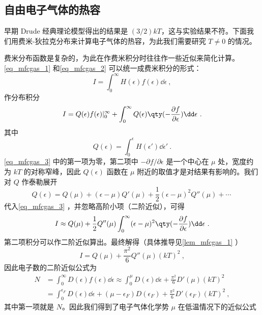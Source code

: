 \subsection{自由电子气体的热容}
早期 Drude 经典理论模型得出的结果是 $(3/2)k T$，这与实验结果不符。下面我们用费米-狄拉克分布来计算电子气体的热容，为此我们需要研究 $T\neq 0$ 的情况。

费米分布函数是复杂的，为此在作费米积分时往往作一些近似来简化计算。\autoref{eq_mfcgas_1} 和\autoref{eq_mfcgas_2} 可以统一成费米积分的形式：
\begin{equation}
I=\int_0^\infty H(\epsilon)f(\epsilon)\dd\epsilon~,
\end{equation}
作分布积分
\begin{equation}\label{eq_mfcgas_3}
I=Q(\epsilon)f(\epsilon)|_0^\infty + \int_0^\infty Q(\epsilon)\qty(-\frac{\partial f}{\partial\epsilon})\dd \epsilon~.
\end{equation}
其中
\begin{equation}
Q(\epsilon)=\int_0^\epsilon H(\epsilon')\dd\epsilon'~.
\end{equation}
\autoref{eq_mfcgas_3} 中的第一项为零，第二项中 $-\partial f/\partial \epsilon$ 是一个中心在 $\mu$ 处，宽度约为 $kT$ 的对称窄峰，因此 $Q(\epsilon)$ 函数在 $\mu$ 附近的取值才是对结果有影响的。我们对 $Q$ 作泰勒展开
\begin{equation}
Q(\epsilon)=Q(\mu)+(\epsilon-\mu)Q'(\mu)+\frac{1}{2}(\epsilon-\mu)^2 Q''(\mu)+\cdots~
\end{equation}
代入\autoref{eq_mfcgas_3} ，并忽略高阶小项（二阶近似），可得
\begin{equation}
I\approx Q(\mu)+\frac{1}{2}Q''(\mu)\int_0^\infty (\epsilon-\mu)^2 \qty(-\frac{\partial f}{\partial \epsilon})\dd\epsilon~.
\end{equation}
第二项积分可以作二阶近似算出。最终解得（具体推导见\autoref{lem_mfcgas_1} ）
\begin{equation}
I=Q(\mu)+\frac{\pi^2}{6}Q''(\mu)(k T)^2~,
\end{equation}
因此电子数的二阶近似公式为
\begin{equation}
\begin{aligned}
N&=\int_0^\infty D(\epsilon) f(\epsilon) \dd\epsilon \approx 
\int_0^\mu D(\epsilon) \dd \epsilon + \frac{\pi^2}{6}D'(\mu)(kT)^2\\
&=\int_0^{\epsilon_F} D(\epsilon)\dd\epsilon+(\mu-\epsilon_F) D(\epsilon_F) + \frac{\pi^2}{6}D'(\epsilon_F)(kT)^2~,
\end{aligned}
\end{equation}
其中第一项就是 $N$。因此我们得到了电子气体化学势 $\mu$ 在低温情况下的近似公式
